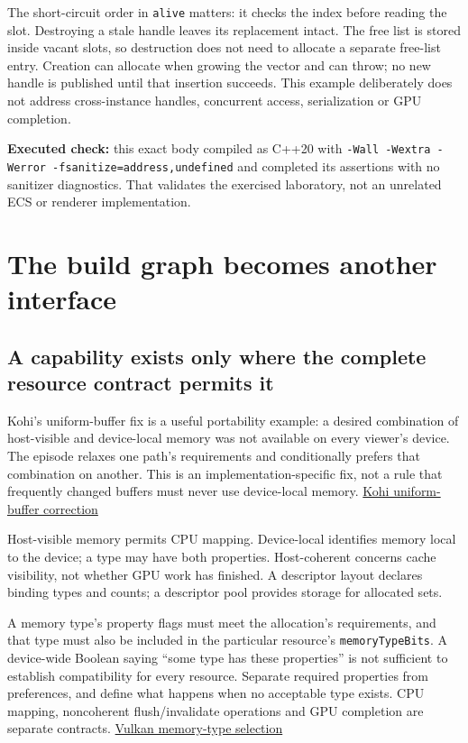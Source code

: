 The short-circuit order in \texttt{alive} matters: it checks the index before reading the slot. Destroying a stale handle leaves its replacement intact. The free list is stored inside vacant slots, so destruction does not need to allocate a separate free-list entry. Creation can allocate when growing the vector and can throw; no new handle is published until that insertion succeeds. This example deliberately does not address cross-instance handles, concurrent access, serialization or GPU completion.

\textbf{Executed check:} this exact body compiled as C++20 with \texttt{-Wall\ -Wextra\ -Werror\ -fsanitize=address,undefined} and completed its assertions with no sanitizer diagnostics. That validates the exercised laboratory, not an unrelated ECS or renderer implementation.

\section{The build graph becomes another interface}\label{01-foundations-i-ch008-the-build-graph-becomes-another-interface}

\subsection{A capability exists only where the complete resource contract permits it}\label{01-foundations-i-ch008-a-capability-exists-only-where-the-complete-resource-contract-permits-it}

Kohi's uniform-buffer fix is a useful portability example: a desired combination of host-visible and device-local memory was not available on every viewer's device. The episode relaxes one path's requirements and conditionally prefers that combination on another. This is an implementation-specific fix, not a rule that frequently changed buffers must never use device-local memory. \href{https://www.youtube.com/watch?v=aD6fZ7tQSAY}{Kohi uniform-buffer correction}

Host-visible memory permits CPU mapping. Device-local identifies memory local to the device; a type may have both properties. Host-coherent concerns cache visibility, not whether GPU work has finished. A descriptor layout declares binding types and counts; a descriptor pool provides storage for allocated sets.

A memory type's property flags must meet the allocation's requirements, and that type must also be included in the particular resource's \texttt{memoryTypeBits}. A device-wide Boolean saying ``some type has these properties'' is not sufficient to establish compatibility for every resource. Separate required properties from preferences, and define what happens when no acceptable type exists. CPU mapping, noncoherent flush/invalidate operations and GPU completion are separate contracts. \href{https://docs.vulkan.org/spec/latest/chapters/memory.html}{Vulkan memory-type selection}

